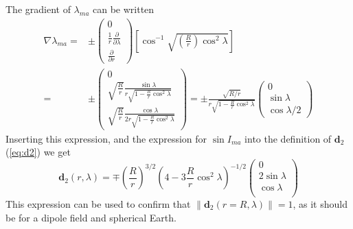 \documentclass[11pt]{article}
\begin{document}
The gradient of $\lambda_{ma}$ can be written
\begin{align}
\nabla\lambda_{ma} =& \pm\begin{pmatrix} 0\\
\frac{1}{r}\frac{\partial}{\partial \lambda}\\
\frac{\partial}{\partial r} \end{pmatrix}\left[\cos^{-1}\sqrt{\left(\frac{R}{r}\right)\cos^2\lambda}\right]\nonumber\\ 
=& \pm\begin{pmatrix} 0\\
\sqrt{\frac{R}{r}}\frac{\sin\lambda}{r\sqrt{1-\frac{R}{r}\cos^2\lambda}}\\
\sqrt{\frac{R}{r}}\frac{\cos\lambda}{2r\sqrt{1 - \frac{R}{r}\cos^2\lambda}}
\end{pmatrix} = \pm\frac{\sqrt{R/r}}{r\sqrt{1 - \frac{R}{r}\cos^2\lambda}}\begin{pmatrix} 0\\
\sin\lambda\\
\cos\lambda/2
\end{pmatrix}
\end{align}
Inserting this expression, and the expression for $\sin I_{ma}$ into the definition of $\mathbf{d}_2$ (\ref{eq:d2}) we get
\begin{equation}
\boxed{\mathbf{d}_2(r, \lambda) = \mp\left(\frac{R}{r}\right)^{3/2}\left(4 - 3\frac{R}{r}\cos^2\lambda\right)^{-1/2}\left(\begin{array}{c}
0\\
2\sin \lambda\\
\cos \lambda\\
\end{array}\right)}
\end{equation}
This expression can be used to confirm that $\|\mathbf{d}_2(r = R, \lambda)\| = 1$, as it should be for a dipole field and spherical Earth.
\end{document}
